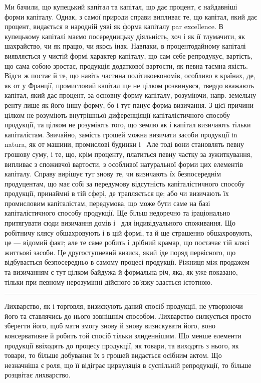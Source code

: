 Ми бачили, що купецький капітал та капітал, що дає процент, є найдавніші
форми капіталу. Однак, з самої природи справи випливає те, що капітал, який дає
процент, видається в народній уяві як форма капіталу par excellence. В купецькому
капіталі маємо посередницьку діяльність, хоч і як її тлумачити, як шахрайство, чи
як працю, чи якось інак. Навпаки, в процентодайному капіталі виявляється у чистій
формі характер капіталу, що сам себе репродукує, вартість, що сама собою зростає,
продукція додаткової вартости, як певна таємна якість. Відси ж постає й те, що
навіть частина політикоекономів, особливо в країнах, де, як от у Франції,
промисловий капітал ще не цілком розвинувся, твердо вважають капітал, який
дає процент, за основну форму капіталу, розуміючи, напр. земельну ренту
лише як його іншу форму, бо і тут панує форма визичання. З цієї причини
цілком не розуміють внутрішньої диференціяції капіталістичного способу продукції,
та цілком не розуміють того, що землю як і капітал визичають тільки
капіталістам. Звичайно, замість грошей можна визичати засоби продукції in natura,
як от машини, промислові будинки і~ Але тоді вони становлять певну
грошову суму, і те, що, крім проценту, платиться певну частку за зужиткування,
випливає з споживчої вартости, з особливої натуральної форми цих елементів
капіталу. Справу вирішує тут знову те, чи визичають їх безпосереднім продуцентам,
що має собі за передумову відсутність капіталістичного способу продукції,
принаймні в тій сфері, де трапляється це; або чи визичають їх промисловим
капіталістам, передумова, що може бути саме на базі капіталістичного
способу продукції. Ще більш недоречно та іраціонально притягувати сюди визичання
домів і~ для індивідуального споживання. Що робітничу клясу
обшахровують і в цій формі, та й ще страшенно обшахровують, це — відомий
факт; але те саме робить і дрібний крамар, що постачає тій клясі життьові
засоби. Це другоступневий визиск, який іде поряд первісного, що відбувається
безпосередньо в самому процесі продукції. Ріжниця між продажем та визичанням
є тут цілком байдужа й формальна річ, яка, як уже показано, тільки при
певному нерозумінні дійсного зв’язку здається істотною.

\plainbreak{3}

Лихварство, як і торговля, визискують даний спосіб продукції, не утворюючи
його та ставлячись до нього зовнішнім способом. Лихварство силкується
просто зберегти його, щоб мати змогу знову й знову визискувати його, воно консервативне
й робить той спосіб тільки злиденнішим. Що менше елементи продукції
ввіходять до процесу продукції, як товари, та виходять з нього, як товари,
то більше добування їх з грошей видається осібним актом. Що незначніша
є роля, що її відіграє циркуляція в суспільній репродукції, то більше розцвітає
лихварство.

